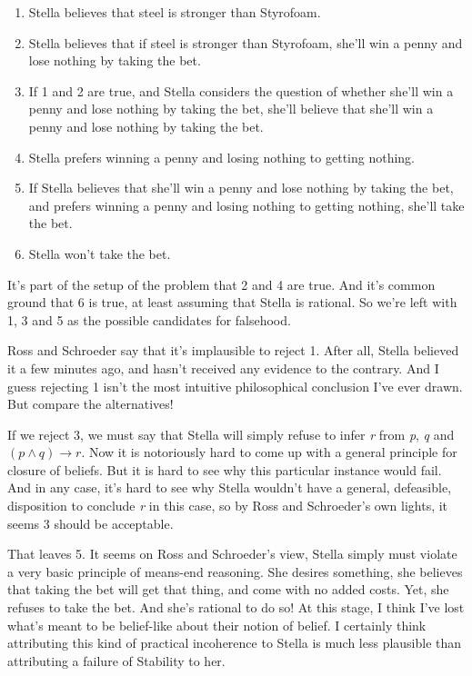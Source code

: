 \begin{enumerate}
\item Stella believes that steel is stronger than Styrofoam.

\item Stella believes that if steel is stronger than Styrofoam, she'll win a penny and lose nothing by taking the bet.

\item If 1 and 2 are true, and Stella considers the question of whether she'll win a penny and lose nothing by taking the bet, she'll believe that she'll win a penny and lose nothing by taking the bet.

\item Stella prefers winning a penny and losing nothing to getting nothing.

\item If Stella believes that she'll win a penny and lose nothing by taking the bet, and prefers winning a penny and losing nothing to getting nothing, she'll take the bet.

\item Stella won't take the bet.

\end{enumerate}
It's part of the setup of the problem that 2 and 4 are true. And it's common ground that 6 is true, at least assuming that Stella is rational. So we're left with 1, 3 and 5 as the possible candidates for falsehood.

Ross and Schroeder say that it's implausible to reject 1. After all, Stella believed it a few minutes ago, and hasn't received any evidence to the contrary. And I guess rejecting 1 isn't the most intuitive philosophical conclusion I've ever drawn. But compare the alternatives!

If we reject 3, we must say that Stella will simply refuse to infer \emph{r} from \emph{p}, \emph{q} and $(p \wedge q) \rightarrow r$. Now it is notoriously hard to come up with a general principle for closure of beliefs. But it is hard to see why this particular instance would fail. And in any case, it's hard to see why Stella wouldn't have a general, defeasible, disposition to conclude \emph{r} in this case, so by Ross and Schroeder's own lights, it seems 3 should be acceptable.

That leaves 5. It seems on Ross and Schroeder's view, Stella simply must violate a very basic principle of means-end reasoning. She desires something, she believes that taking the bet will get that thing, and come with no added costs. Yet, she refuses to take the bet. And she's rational to do so! At this stage, I think I've lost what's meant to be belief-like about their notion of belief. I certainly think attributing this kind of practical incoherence to Stella is much less plausible than attributing a failure of Stability to her.

